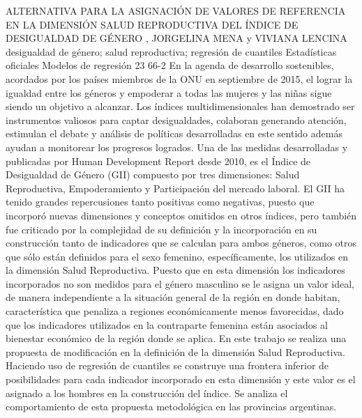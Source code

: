 \A
{ALTERNATIVA PARA LA ASIGNACIÓN DE VALORES DE REFERENCIA EN LA DIMENSIÓN SALUD REPRODUCTIVA DEL ÍNDICE DE DESIGUALDAD DE GÉNERO}
{, JORGELINA MENA y VIVIANA LENCINA}
{
\\}
{desigualdad de género; salud reproductiva; regresión de cuantiles} 
 {Estadísticas oficiales} 
 {Modelos de regresión} 
 {23} 
 {66-2}
{En la agenda de desarrollo sostenibles, acordados por los países miembros de la ONU en septiembre de 2015, el lograr la igualdad entre los géneros y empoderar a todas las mujeres y las niñas sigue siendo un objetivo a alcanzar. Los índices multidimensionales han demostrado ser instrumentos valiosos para captar desigualdades, colaboran generando atención, estimulan el debate y análisis de políticas desarrolladas en este sentido además ayudan a monitorear los progresos logrados. Una de las medidas desarrolladas y publicadas por Human Development Report desde 2010, es el Índice de Desigualdad de Género (GII) compuesto por tres dimensiones: Salud Reproductiva, Empoderamiento y Participación del mercado laboral. El GII ha tenido grandes repercusiones tanto positivas como negativas, puesto que incorporó nuevas dimensiones y conceptos omitidos en otros índices, pero también fue criticado por la complejidad de su definición y la incorporación en su construcción tanto de indicadores que se calculan para ambos géneros, como otros que sólo están definidos para el sexo femenino, específicamente, los utilizados en la dimensión Salud Reproductiva. Puesto que en esta dimensión los indicadores incorporados no son medidos para el género masculino se le asigna un valor ideal, de manera independiente a la situación general de la región en donde habitan, característica que penaliza a regiones económicamente menos favorecidas, dado que los indicadores utilizados en la contraparte femenina están asociados al bienestar económico de la región donde se aplica. En este trabajo se realiza una propuesta de modificación en la definición de la dimensión Salud Reproductiva. Haciendo uso de regresión de cuantiles se construye una frontera inferior de posibilidades para cada indicador incorporado en esta dimensión y este valor es el asignado a los hombres en la construcción del índice. Se analiza el comportamiento de esta propuesta metodológica en las provincias argentinas.}
